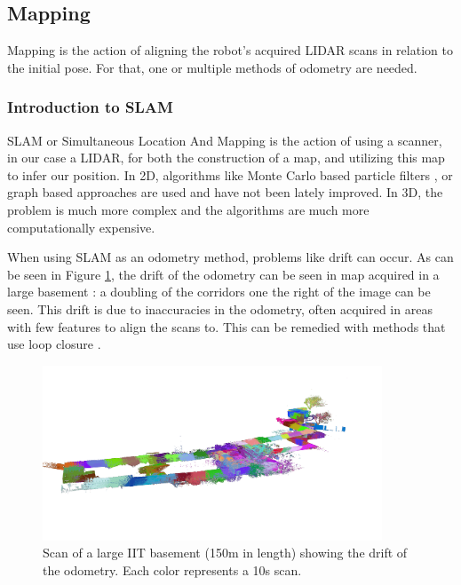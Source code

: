 \documentclass[12pt]{article}
\begin{document}
    \subsection{Mapping}

        Mapping is the action of aligning the robot's acquired LIDAR scans in relation to the initial pose. For that, one or multiple methods of odometry are needed. 
        \subsubsection{Introduction to SLAM}
        SLAM or Simultaneous Location And Mapping is the action of using a scanner, in our case a LIDAR, for both the construction of a map, and utilizing this map to infer our position. In 2D, algorithms like Monte Carlo based particle filters \cite{fox1999monte}, or graph based approaches \cite{macenski2021slam} are used and have not been lately improved. In 3D, the problem is much more complex and the algorithms are much more computationally expensive. 
        
        When using SLAM as an odometry method, problems like drift can occur. As can be seen in Figure \ref{fig:scan_basement}, the drift of the odometry can be seen in map acquired in a large basement : a doubling of the corridors one the right of the image can be seen. This drift is due to inaccuracies in the odometry, often acquired in areas with few features to align the scans to. This can be remedied with methods that use loop closure \cite{chen2021inertial} \cite{liu2022enhanced}.

        \begin{figure}[H]
            \centering
            \includegraphics[width=0.9\textwidth]{Images/scan_basement_no_bg.png}
            \caption{Scan of a large IIT basement (150m in length) showing the drift of the odometry. Each color represents a 10s scan.} 
            \label{fig:scan_basement}
        \end{figure}
\end{document}
